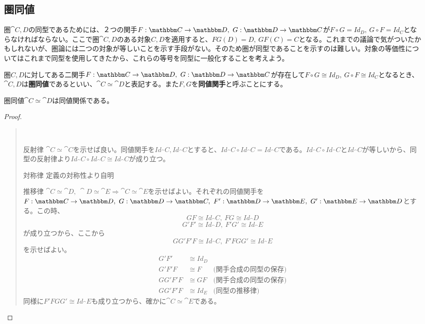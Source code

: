   \subsection{圏同値}
  圏$\cat{C,D}$の同型であるためには、２つの関手$\functor{F}{C}{D},\ \functor{G}{D}{C}$が$F\circ G=Id_D,\ G\circ F=Id_C$とならなければならない。ここで圏$\cat{C,D}$のある対象$C,D$を適用すると、$FG(D)=D,\ GF(C)=C$となる。これまでの議論で気がついたかもしれないが、圏論には二つの対象が等しいことを示す手段がない。そのため圏が同型であることを示すのは難しい。対象の等価性についてはこれまで同型を使用してきたから、これらの等号を同型に一般化することを考えよう。\\
  \begin{define}
    圏$C,D$に対してある二関手$\functor{F}{C}{D},\ \functor{G}{D}{C}$が存在して$F\circ G\cong Id_D,\ G\circ F\cong Id_C$となるとき、$\cat{C,D}$は\textbf{圏同値}であるといい、$\cat{C}\simeq \cat{D}$と表記する。また$F,G$を\textbf{同値関手}と呼ぶことにする。
  \end{define}
  \begin{prop}[圏同値の同値性]
    圏同値$\cat{C}\simeq \cat{D}$は同値関係である。
  \end{prop}
  \begin{proof}
    \begin{quote}~\\
			\begin{mydescription}
				\item[反射律] $\cat{C}\simeq \cat{C}$を示せば良い。同値関手を$Id_\cat{C},Id_\cat{C}$とすると、$Id_\cat{C}\circ Id_\cat{C}=Id_\cat{C}$である。$Id_\cat{C}\circ Id_\cat{C}$と$Id_\cat{C}$が等しいから、同型の反射律より$Id_\cat{C}\circ Id_\cat{C}\cong Id_\cat{C}$が成り立つ。
				\item[対称律]定義の対称性より自明
				\item[推移律]$\cat{C}\simeq \cat{D},\ \cat{D}\simeq\cat{E}\Longrightarrow \cat{C}\simeq\cat{E}$を示せばよい。それぞれの同値関手を$\functor{F}{C}{D},\ \functor{G}{D}{C},\ \functor{F'}{D}{E},\ \functor{G'}{E}{D}$とする。この時、
				\[GF\cong Id_\cat{C},\ FG\cong Id_\cat{D}\]
        \[G'F'\cong Id_\cat{D},\ F'G'\cong Id_\cat{E}\]が成り立つから、ここから\[GG'F'F\cong Id_\cat{C},\ F'FGG'\cong Id_\cat{E}\]を示せばよい。\\
        \begin{align*}
          G'F'&\cong Id_D\\
          G'F'F&\cong F&\text{(関手合成の同型の保存)}\\
          GG'F'F&\cong GF&\text{(関手合成の同型の保存)}\\
          GG'F'F&\cong Id_E&\text{(同型の推移律)}
        \end{align*}
        同様に$F'FGG'\cong Id_\cat{E}$も成り立つから、確かに$\cat{C}\simeq\cat{E}$である。
      \end{mydescription}
    \end{quote}
  \end{proof}
